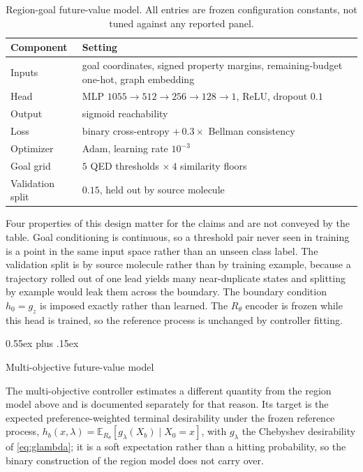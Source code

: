 \documentclass{article}
\makeatletter
\theoremstyle{definition}
\theoremstyle{remark}
\def\subsection{\@startsection{subsection}{2}{\z@}{-1.2ex plus -0.4ex minus -.2ex}%
  {0.55ex plus .15ex}{\normalsize\sc\raggedright}}
\newcommand{\E}{\mathbb{E}}
\makeatother
\begin{document}
\begin{table}[h]
\centering\small
\caption{\small Region-goal future-value model. All entries are frozen
configuration constants, not tuned against any reported panel.}
\label{tab:controller-config}
\begin{tabular}{ll}
\toprule
Component & Setting \\
\midrule
Inputs & goal coordinates, signed property margins, remaining-budget one-hot, graph embedding \\
Head & MLP $1055\rightarrow512\rightarrow256\rightarrow128\rightarrow1$, ReLU, dropout $0.1$ \\
Output & sigmoid reachability \\
Loss & binary cross-entropy $+\,0.3\times$ Bellman consistency \\
Optimizer & Adam, learning rate $10^{-3}$ \\
Goal grid & $5$ QED thresholds $\times\ 4$ similarity floors \\
Validation split & $0.15$, held out by source molecule \\
\bottomrule
\end{tabular}
\end{table}

Four properties of this design matter for the claims and are not conveyed by the
table. Goal conditioning is continuous, so a threshold pair never seen in
training is a point in the same input space rather than an unseen class label.
The validation split is by source molecule rather than by training example,
because a trajectory rolled out of one lead yields many near-duplicate states and
splitting by example would leak them across the boundary. The boundary condition
$h_0=g_z$ is imposed exactly rather than learned. The $R_\theta$ encoder is frozen
while this head is trained, so the reference process is unchanged by
controller fitting.

\subsection{Multi-objective future-value model}
\label{app:mo-controller}

The multi-objective controller estimates a different quantity from the region model above and is documented separately for that reason. Its target is the expected preference-weighted terminal desirability under the frozen reference process, $h_b(x,\lambda)=\E_{R_\theta}[g_\lambda(X_b)\mid X_0=x]$, with $g_\lambda$ the Chebyshev desirability of \eqref{eq:glambda}; it is a soft expectation rather than a hitting probability, so the binary construction of the region model does not carry over.
\end{document}

